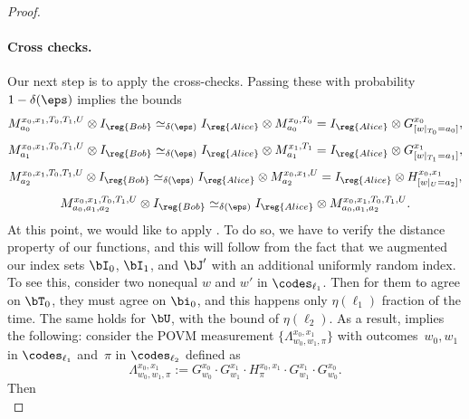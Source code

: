 \begin{proof}
\paragraph{Cross checks.}
Our next step is to apply the cross-checks. Passing these with probability $1-\delta(\eps)$ implies the bounds
\begin{equation}\label{eq:apply-the-cross-checks}
M^{x_0, x_1, T_0, T_1, U}_{a_0} \otimes I_{\reg{Bob}}\simeq_{\delta(\eps)} I_{\reg{Alice}} \otimes M^{x_0, T_0}_{a_0}
= I_{\reg{Alice}} \otimes G^{x_0}_{[w|_{T_0} = a_0]},
\end{equation}
\begin{equation}\label{eq:apply-the-cross-checks-2}
M^{x_0, x_1, T_0, T_1, U}_{a_1} \otimes I_{\reg{Bob}}\simeq_{\delta(\eps)} I_{\reg{Alice}} \otimes  M^{x_1, T_1}_{a_1}
= I_{\reg{Alice}} \otimes G^{x_1}_{[w|_{T_1} = a_1]},
\end{equation}
\begin{equation*}
M^{x_0, x_1, T_0, T_1, U}_{a_2} \otimes I_{\reg{Bob}}\simeq_{\delta(\eps)} I_{\reg{Alice}} \otimes  M^{x_0, x_1, U}_{a_2}
= I_{\reg{Alice}} \otimes H^{x_0, x_1}_{[w|_{U} = a_2]},
\end{equation*}
\begin{equation}\label{eq:Ms-self-consistency}
M^{x_0, x_1, T_0, T_1, U}_{a_0, a_1, a_2} \otimes I_{\reg{Bob}}\simeq_{\delta(\eps)} I_{\reg{Alice}} \otimes  M^{x_0, x_1, T_0, T_1, U}_{a_0, a_1, a_2}.
\end{equation}
At this point, we would like to apply .
To do so, we have to verify the distance property of our functions,
and this will follow from the fact that we augmented our index sets $\bI_0$, $\bI_1$, and $\bJ'$ with an additional uniformly random index.
To see this, consider two nonequal $w$ and $w'$ in $\codes_{\ell_1}$.
Then for them to agree on $\bT_0$, they must agree on $\bi_0$, and this happens only $\eta(\ell_1)$ fraction of the time.
The same holds for $\bU$, with the bound of $\eta(\ell_2)$.
As a result,  implies the following:
consider the POVM measurement $\{\Lambda^{x_0, x_1}_{w_0, w_1, \pi}\}$
with outcomes~$w_0, w_1$ in $\codes_{\ell_1}$ and~$\pi$ in $\codes_{\ell_2}$
defined as
\begin{equation}\label{eq:dont-touch-me-bro}
\Lambda^{x_0, x_1}_{w_0, w_1, \pi}
:= G^{x_0}_{w_0} \cdot G^{x_1}_{w_1} \cdot H^{x_0, x_1}_{\pi} \cdot G^{x_1}_{w_1} \cdot G^{x_0}_{w_0}.
\end{equation}
Then
\begin{equation}\label{eq:gonna-use-this-once}

\end{equation}
\end{proof}
